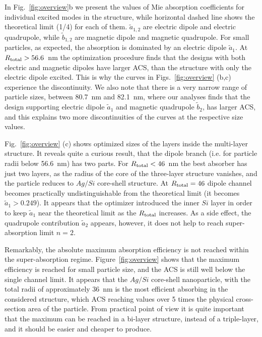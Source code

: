 \documentclass[aps,prl,twocolumn,showpacs,superscriptaddress,groupedaddress]{revtex4-1}
\begin{document}
In Fig.~\ref{fig:overview}b we present the values of Mie absorption
coefficients for individual excited modes in the structure, while
horizontal dashed line shows the theoretical limit (1/4) for each of
them. $\tilde{a}_{1,2}$ are electric dipole and electric quadrupole,
while $\tilde{b}_{1,2}$ are magnetic dipole and magnetic
quadrupole. For small particles, as expected, the absorption is
dominated by an electric dipole $\tilde{a}_1$.  At $R_{\rm total} >
56.6$~nm the optimization procedure finds that the designs with both
electric and magnetic dipoles have larger ACS, than the structure with
only the electric dipole excited. This is why the curves in
Figs.~\ref{fig:overview} (b,c) experience the discontinuity. We also
note that there is a very narrow range of particle sizes, between
80.7~nm and 82.1~nm, where our analyses finds that the design
supporting electric dipole $\tilde{a}_1$ and magnetic quadrupole
$\tilde{b}_2$, has larger ACS, and this explains two more
discontinuities of the curves at the respective size values.

Fig.~\ref{fig:overview} (c) shows optimized sizes of the layers inside
the multi-layer structure. It reveals quite a curious result, that the
dipole branch (i.e. for particle radii below 56.6~nm) has two
parts. For $R_{\rm total}<46$~nm the best absorber has just two
layers, as the radius of the core of the three-layer structure
vanishes, and the particle reduces to $Ag/Si$ core-shell structure.
At $R_{\rm total}=46$ dipole channel becomes practically
undistinguishable from the theoretical limit (it becomes
$\tilde{a}_1>0.249$).  It appears that the optimizer introduced the
inner $Si$ layer in order to keep $\tilde{a}_1$ near the theoretical
limit as the $R_{\rm total}$ increases.  As a side effect, the
quadrupole contribution $\tilde{a}_2$ appears, however, it does not
help to reach super-absorption limit $n=2$.

Remarkably, the absolute maximum absorption efficiency is not reached
within the super-absorption regime. Figure~\ref{fig:overview} shows
that the maximum efficiency is reached for small particle size, and
the ACS is still well below the single channel limit. It appears that
the $Ag/Si$ core-shell nanoparticle, with the total radii of
approximately 36~nm is the most efficient absorbing in the considered
structure, which ACS reaching values over 5 times the physical
cross-section area of the particle.  From practical point of view it
is quite important that the maximum can be reached in a bi-layer
structure, instead of a triple-layer, and it should be easier and
cheaper to produce.
\end{document}
